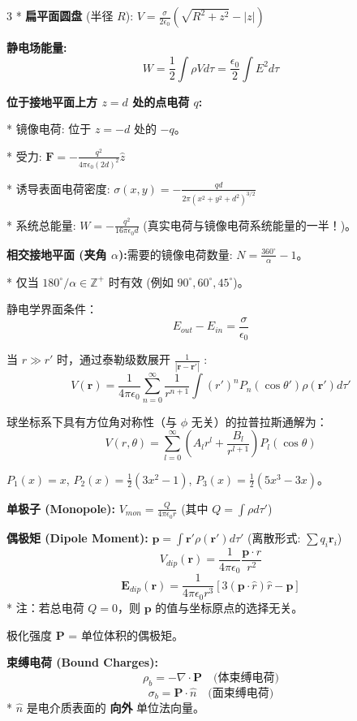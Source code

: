 \documentclass[10pt,a4paper,landscape,utf8]{ctexart}
\newcommand{\bs}[1]{\boldsymbol{#1}}
\begin{document}
\begin{multicols*}{3}
* \textbf{扁平面圆盘} (半径 $R$): $V = \frac{\sigma}{2\epsilon_0}(\sqrt{R^2+z^2} - |z|)$

\textbf{静电场能量:}
$$ W = \frac{1}{2} \int \rho V d\tau = \frac{\epsilon_0}{2} \int E^2 d\tau $$


\textbf{位于接地平面上方 $z=d$ 处的点电荷 $q$:}

* 镜像电荷: 位于 $z=-d$ 处的 $-q$。

* 受力: $\bs{F} = -\frac{q^2}{4\pi\epsilon_0 (2d)^2}\hat{z}$

* 诱导表面电荷密度: $\sigma(x,y) = -\frac{qd}{2\pi(x^2+y^2+d^2)^{3/2}}$

* 系统总能量: $W = -\frac{q^2}{16\pi\epsilon_0 d}$ (真实电荷与镜像电荷系统能量的一半！)。

\textbf{相交接地平面 (夹角 $\alpha$):}需要的镜像电荷数量: $N = \frac{360^\circ}{\alpha} - 1$。

* 仅当 $180^\circ/\alpha \in \mathbb{Z}^+$ 时有效 (例如 $90^\circ, 60^\circ, 45^\circ$)。

静电学界面条件：$$E_{out}-E_{in} = \frac{\sigma}{\epsilon_0}$$


当 $r \gg r'$ 时，通过泰勒级数展开 $\frac{1}{|\bs{r}-\bs{r}'|}$ :
$$ V(\bs{r}) = \frac{1}{4\pi\epsilon_0} \sum_{n=0}^{\infty} \frac{1}{r^{n+1}} \int (r')^n P_n(\cos\theta') \rho(\bs{r}') d\tau' $$

球坐标系下具有方位角对称性（与 $\phi$ 无关）的拉普拉斯通解为：$$ V(r, \theta) = \sum_{l=0}^{\infty} \left( A_l r^l + \frac{B_l}{r^{l+1}} \right) P_l(\cos\theta) $$

$P_1(x)=x$, $P_2(x)=\frac{1}{2}(3x^2-1)$, $P_3(x)=\frac{1}{2}(5x^3-3x)$。

\textbf{单极子 (Monopole):} $V_{mon} = \frac{Q}{4\pi\epsilon_0 r}$ (其中 $Q = \int \rho d\tau'$)

\textbf{偶极矩 (Dipole Moment):} $\bs{p} = \int \bs{r}' \rho(\bs{r}') d\tau'$ (离散形式: $\sum q_i \bs{r}_i$)
$$ V_{dip}(\bs{r}) = \frac{1}{4\pi\epsilon_0} \frac{\bs{p} \cdot \hat{r}}{r^2} $$
$$ \bs{E}_{dip}(\bs{r}) = \frac{1}{4\pi\epsilon_0 r^3} [3(\bs{p}\cdot\hat{r})\hat{r} - \bs{p}] $$
* 注：若总电荷 $Q=0$，则 $\bs{p}$ 的值与坐标原点的选择无关。


极化强度 $\bs{P}$ = 单位体积的偶极矩。

\textbf{束缚电荷 (Bound Charges):}
$$ \rho_b = -\nabla \cdot \bs{P} \quad \text{(体束缚电荷)} $$
$$ \sigma_b = \bs{P} \cdot \hat{n} \quad \text{(面束缚电荷)} $$
* $\hat{n}$ 是电介质表面的 \textbf{向外} 单位法向量。


\end{multicols*}
\end{document}
